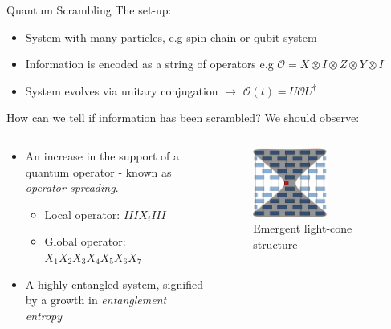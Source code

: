 \begin{frame}{Quantum Scrambling}
  The set-up:
  \begin{itemize}
    \item System with many particles, e.g spin chain or qubit system
    \item Information is encoded as a string of operators e.g $ \mathcal{O} = X\otimes I\otimes Z\otimes Y\otimes I$
    \item System evolves via unitary conjugation $\to$ $\mathcal{O}(t) = U \mathcal{O} U^{\dagger}$
  \end{itemize}
      How can we tell if information has been scrambled? We should observe:
  \begin{columns}
    \vspace{-5cm}
    \begin{column}{0.55\textwidth}
      \vspace{-1.35cm}
      
  \begin{itemize}
    \item An increase in the support of a quantum operator - known as \textit{operator spreading}.
    \begin{itemize}
      \item Local operator: $I I I X_i I I I$
      \item Global operator: $X_1 X_2 X_3 X_4 X_5 X_6 X_7$
    \end{itemize}
    \item A highly entangled system, signified by a growth in \textit{entanglement entropy}
  \end{itemize}
\end{column}
\begin{column}{0.45\textwidth}
    \begin{figure}
      \includegraphics[width=0.6\textwidth]{QS_Images/lightcone.png}
      \caption{Emergent light-cone structure}
    \end{figure}
\end{column}
\end{columns}

\end{frame}

